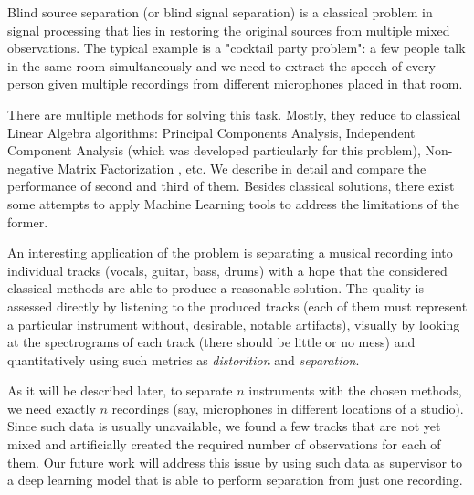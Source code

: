 \documentclass[../main.tex]{subfiles} %
\begin{document}

Blind source separation \cite{bss} (or blind signal separation) is a classical problem in signal processing that lies in restoring the original sources from multiple mixed observations. The typical example is a "cocktail party problem": a few people talk in the same room simultaneously and we need to extract the speech of every person given multiple recordings from different microphones placed in that room.

There are multiple methods for solving this task. Mostly, they reduce to classical Linear Algebra algorithms: Principal Components Analysis, Independent Component Analysis \cite{ica} (which was developed particularly for this problem), Non-negative Matrix Factorization \cite{nmf}, etc. We describe in detail and compare the performance of second and third of them. Besides classical solutions, there exist some attempts to apply Machine Learning tools \cite{mlbss} to address the limitations of the former.


An interesting application of the problem is separating a musical recording into individual tracks (vocals, guitar, bass, drums) with a hope that the considered classical methods are able to produce a reasonable solution. 
The quality is assessed directly by listening to the produced tracks (each of them must represent a particular instrument without, desirable, notable artifacts), visually by looking at the spectrograms of each track (there should be little or no mess) and quantitatively using such metrics as \textit{distorition} and \textit{separation}.


As it will be described later, to separate $n$ instruments with the chosen methods, we need exactly $n$ recordings (say, microphones in different locations of a studio). Since such data is usually unavailable, we found a few tracks that are not yet mixed and artificially created the required number of observations for each of them. Our future work will address this issue by using such data as supervisor to a deep learning model that is able to perform separation from just one recording.
 
\end{document}
